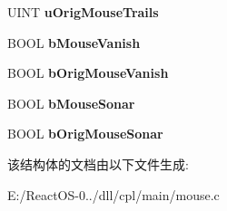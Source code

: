 \begin{DoxyCompactItemize}
U\+I\+NT {\bfseries u\+Orig\+Mouse\+Trails}
\item 
\mbox{\label{struct___o_p_t_i_o_n___d_a_t_a_ac5aae9c284d374f5e47fd0dc38bfbc46}} 
B\+O\+OL {\bfseries b\+Mouse\+Vanish}
\item 
\mbox{\label{struct___o_p_t_i_o_n___d_a_t_a_ae1040250f771173a4b0a2d72c5785292}} 
B\+O\+OL {\bfseries b\+Orig\+Mouse\+Vanish}
\item 
\mbox{\label{struct___o_p_t_i_o_n___d_a_t_a_ac0a863e884db69b10d7643913f9da9b5}} 
B\+O\+OL {\bfseries b\+Mouse\+Sonar}
\item 
\mbox{\label{struct___o_p_t_i_o_n___d_a_t_a_a0dd6e09213e24e69c09c66cb046f7850}} 
B\+O\+OL {\bfseries b\+Orig\+Mouse\+Sonar}
\end{DoxyCompactItemize}


该结构体的文档由以下文件生成\+:\begin{DoxyCompactItemize}
\item 
E\+:/\+React\+O\+S-\/0../dll/cpl/main/mouse.\+c\end{DoxyCompactItemize}
